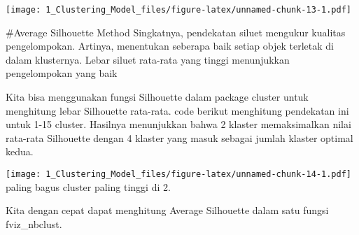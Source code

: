 \documentclass[]{article}
\newenvironment{Shaded}{\begin{snugshade}}{\end{snugshade}}
\newcommand{\CommentTok}[1]{\textcolor[rgb]{0.56,0.35,0.01}{\textit{#1}}}
\newcommand{\ControlFlowTok}[1]{\textcolor[rgb]{0.13,0.29,0.53}{\textbf{#1}}}
\newcommand{\DataTypeTok}[1]{\textcolor[rgb]{0.13,0.29,0.53}{#1}}
\newcommand{\DecValTok}[1]{\textcolor[rgb]{0.00,0.00,0.81}{#1}}
\newcommand{\KeywordTok}[1]{\textcolor[rgb]{0.13,0.29,0.53}{\textbf{#1}}}
\newcommand{\NormalTok}[1]{#1}
\newcommand{\OperatorTok}[1]{\textcolor[rgb]{0.81,0.36,0.00}{\textbf{#1}}}
\newcommand{\OtherTok}[1]{\textcolor[rgb]{0.56,0.35,0.01}{#1}}
\newcommand{\StringTok}[1]{\textcolor[rgb]{0.31,0.60,0.02}{#1}}
\begin{document}
\texttt{[image: 1\_Clustering\_Model\_files/figure-latex/unnamed-chunk-13-1.pdf]}

\#Average Silhouette Method Singkatnya, pendekatan siluet mengukur
kualitas pengelompokan. Artinya, menentukan seberapa baik setiap objek
terletak di dalam klusternya. Lebar siluet rata-rata yang tinggi
menunjukkan pengelompokan yang baik

Kita bisa menggunakan fungsi Silhouette dalam package cluster untuk
menghitung lebar Silhouette rata-rata. code berikut menghitung
pendekatan ini untuk 1-15 cluster. Hasilnya menunjukkan bahwa 2 klaster
memaksimalkan nilai rata-rata Silhouette dengan 4 klaster yang masuk
sebagai jumlah klaster optimal kedua.

\begin{Shaded}
\end{Shaded}

\texttt{[image: 1\_Clustering\_Model\_files/figure-latex/unnamed-chunk-14-1.pdf]}
paling bagus cluster paling tinggi di 2.

Kita dengan cepat dapat menghitung Average Silhouette dalam satu fungsi
fviz\_nbclust.
\end{document}

